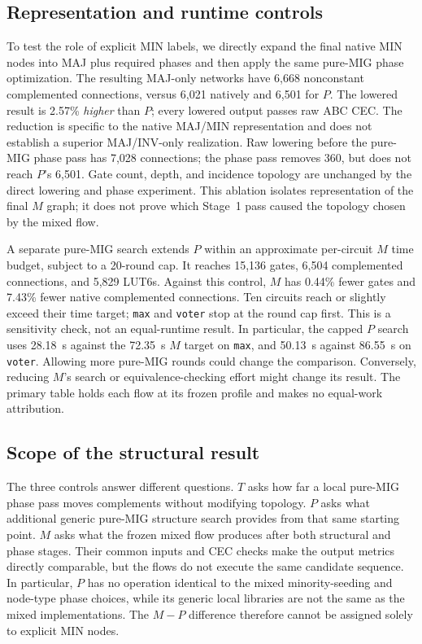 \documentclass[10pt,journal]{IEEEtran}
\begin{document}
\subsection{Representation and runtime controls}
To test the role of explicit MIN labels, we directly expand the final
native MIN nodes into MAJ plus required phases and then apply the same
pure-MIG phase optimization. The resulting MAJ-only networks have 6,668
nonconstant complemented connections, versus 6,021 natively and 6,501
for $P$. The lowered result is 2.57\% \emph{higher} than $P$; every
lowered output passes raw ABC CEC. The reduction is specific to the
native MAJ/MIN representation and does not establish a superior
MAJ/INV-only realization.
Raw lowering before the pure-MIG phase pass has 7,028 connections; the
phase pass removes 360, but does not reach $P$'s 6,501. Gate count,
depth, and incidence topology are unchanged by the direct lowering
and phase experiment. This ablation isolates representation of the
final $M$ graph; it does not prove which Stage~1 pass caused the
topology chosen by the mixed flow.


A separate pure-MIG search extends $P$ within an approximate per-circuit
$M$ time budget, subject to a 20-round cap. It reaches 15,136 gates,
6,504 complemented connections, and 5,829 LUT6s. Against this control,
$M$ has 0.44\% fewer gates and 7.43\% fewer native complemented
connections. Ten circuits reach or slightly exceed their time target;
\texttt{max} and \texttt{voter} stop at the round cap first. This is a
sensitivity check, not an equal-runtime result.
In particular, the capped $P$ search uses 28.18~s against the
72.35~s $M$ target on \texttt{max}, and 50.13~s against 86.55~s on
\texttt{voter}. Allowing more pure-MIG rounds could change the
comparison. Conversely, reducing $M$'s search or equivalence-checking
effort might change its result. The primary table holds each flow
at its frozen profile and makes no equal-work attribution.

\subsection{Scope of the structural result}
The three controls answer different questions. $T$ asks how far a local
pure-MIG phase pass moves complements without modifying topology. $P$
asks what additional generic pure-MIG structure search provides from
that same starting point. $M$ asks what the frozen mixed flow produces
after both structural and phase stages. Their common inputs and CEC
checks make the output metrics directly comparable, but the flows
do not execute the same candidate sequence. In particular, $P$ has
no operation identical to the mixed minority-seeding and node-type
phase choices, while its generic local libraries are not the same as
the mixed implementations. The $M-P$ difference therefore cannot
be assigned solely to explicit MIN nodes.
\end{document}
